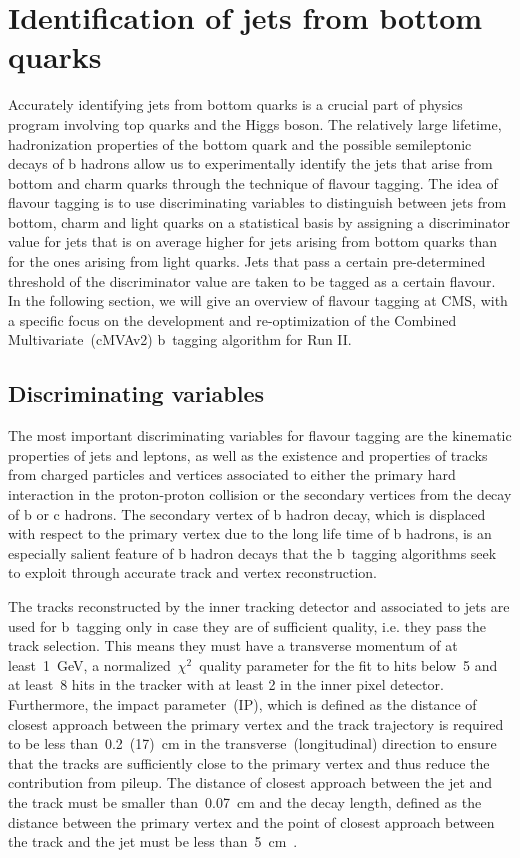 \section{Identification of jets from bottom quarks}
Accurately identifying jets from bottom quarks is a crucial part of physics program involving top quarks and the Higgs boson. The relatively large lifetime, hadronization properties of the bottom quark and the possible semileptonic decays of b hadrons allow us to experimentally identify the jets that arise from bottom and charm quarks through the technique of flavour tagging. The idea of flavour tagging is to use discriminating variables to distinguish between jets from bottom, charm and light quarks on a statistical basis by assigning a discriminator value for jets that is on average higher for jets arising from bottom quarks than for the ones arising from light quarks. Jets that pass a certain pre-determined threshold of the discriminator value are taken to be tagged as a certain flavour. In the following section, we will give an overview of flavour tagging at CMS, with a specific focus on the development and re-optimization of the Combined Multivariate~(cMVAv2) b~tagging algorithm for Run II.

\subsection{Discriminating variables}
The most important discriminating variables for flavour tagging are the kinematic properties of jets and leptons, as well as the existence and properties of tracks from charged particles and vertices associated to either the primary hard interaction in the proton-proton collision or the secondary vertices from the decay of b or c hadrons. The secondary vertex of b hadron decay, which is displaced with respect to the primary vertex due to the long life time of b hadrons, is an especially salient feature of b hadron decays that the b~tagging algorithms seek to exploit through accurate track and vertex reconstruction. 

The tracks reconstructed by the inner tracking detector and associated to jets are used for b~tagging only in case they are of sufficient quality, i.e. they pass the track selection. This means they must have a transverse momentum of at least~1~GeV, a normalized~$\chi^2$~quality parameter for the fit to hits below~5 and at least~8 hits in the tracker with at least 2 in the inner pixel detector. Furthermore, the impact parameter~(IP), which is defined as the distance of closest approach between the primary vertex and the track trajectory is required to be less than~0.2~(17)~cm in the transverse~(longitudinal) direction to ensure that the tracks are sufficiently close to the primary vertex and thus reduce the contribution from pileup. The distance of closest approach between the jet and the track must be smaller than~0.07~cm and the decay length, defined as the distance between the primary vertex and the point of closest approach between the track and the jet must be less than~5~cm~\cite{CMS-PAS-BTV-15-001}.

